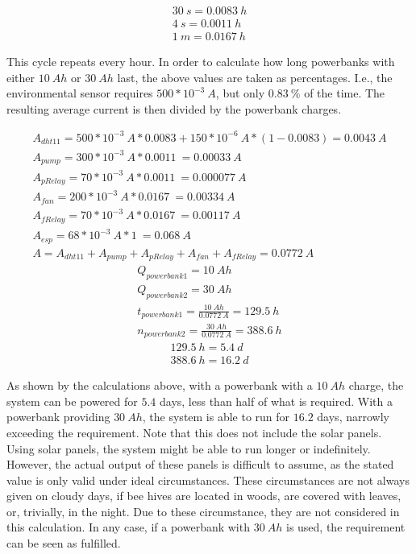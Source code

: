 \begin{align}
    30\ s = 0.0083\ h \\
    4\ s = 0.0011\ h \\
    1\ m = 0.0167\ h
\end{align}

This cycle repeats every hour.
In order to calculate how long powerbanks with either $10\ Ah$ or $30\ Ah$ last, the above values are taken as percentages.
I.e., the environmental sensor requires $500 * 10^{-3}\ A$, but only $0.83\ \%$ of the time.
The resulting average current is then divided by the powerbank charges.

\begin{align}
    A_{dht11} = 500 * 10^{-3}\ A * 0.0083 + 150 * 10^{-6}\ A * (1 - 0.0083) = 0.0043\ A\\
    A_{pump} = 300 * 10^{-3}\ A * 0.0011\  = 0.00033\ A\\
    A_{pRelay} = 70 * 10^{-3}\ A * 0.0011\  = 0.000077\ A\\
    A_{fan} = 200 * 10^{-3}\ A * 0.0167\  = 0.00334\ A\\
    A_{fRelay} = 70 * 10^{-3}\ A * 0.0167\  = 0.00117\ A\\
    A_{esp} = 68*10^{-3}\ A * 1\  = 0.068\ A \\
    A = A_{dht11} + A_{pump} + A_{pRelay} + A_{fan} + A_{fRelay} = 0.0772\ A
\end{align}
\begin{align}
    Q_{powerbank1} = 10\ Ah \\
    Q_{powerbank2} = 30\ Ah \\
    t_{powerbank1} = \frac{10\ Ah}{0.0772\ A} = 129.5\ h \\
    n_{powerbank2} = \frac{30\ Ah}{0.0772\ A} = 388.6\ h
\end{align}
\begin{align}
    129.5\ h = 5.4\ d \\
    388.6\ h = 16.2\ d
\end{align}

As shown by the calculations above, with a powerbank with a $10\ Ah$ charge, the system can be powered for $5.4$ days, less than half of what is required.
With a powerbank providing $30\ Ah$, the system is able to run for $16.2$ days, narrowly exceeding the requirement.
Note that this does not include the solar panels.
Using solar panels, the system might be able to run longer or indefinitely.
However, the actual output of these panels is difficult to assume, as the stated value is only valid under ideal circumstances.
These circumstances are not always given on cloudy days, if bee hives are located in woods, are covered with leaves, or, trivially, in the night.
Due to these circumstance, they are not considered in this calculation.
In any case, if a powerbank with $30\ Ah$ is used, the requirement can be seen as fulfilled.

